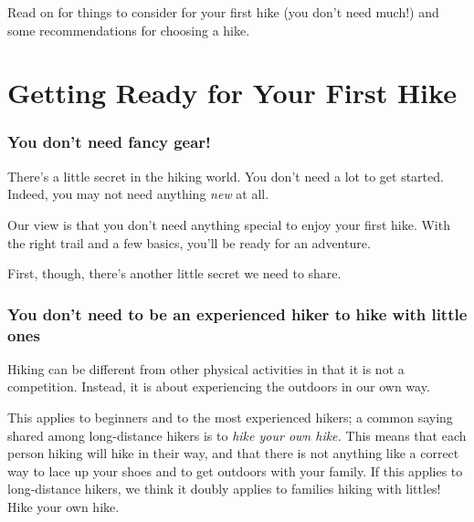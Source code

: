 \documentclass[
  letterpaper,
  DIV=11,
  numbers=noendperiod]{scrreprt}
\begin{document}
Read on for things to consider for your first hike (you don't need
much!) and some recommendations for choosing a hike.

\chapter{Getting Ready for Your First
Hike}\label{getting-ready-for-your-first-hike}

\subsection{You don't need fancy gear!}\label{you-dont-need-fancy-gear}

There's a little secret in the hiking world. You don't need a lot to get
started. Indeed, you may not need anything \emph{new} at all.

Our view is that you don't need anything special to enjoy your first
hike. With the right trail and a few basics, you'll be ready for an
adventure.

First, though, there's another little secret we need to share.

\subsection{You don't need to be an experienced hiker to hike with
little
ones}\label{you-dont-need-to-be-an-experienced-hiker-to-hike-with-little-ones}

Hiking can be different from other physical activities in that it is not
a competition. Instead, it is about experiencing the outdoors in our own
way.

This applies to beginners and to the most experienced hikers; a common
saying shared among long-distance hikers is to \emph{hike your own
hike.} This means that each person hiking will hike in their way, and
that there is not anything like a correct way to lace up your shoes and
to get outdoors with your family. If this applies to long-distance
hikers, we think it doubly applies to families hiking with littles! Hike
your own hike.
\end{document}
